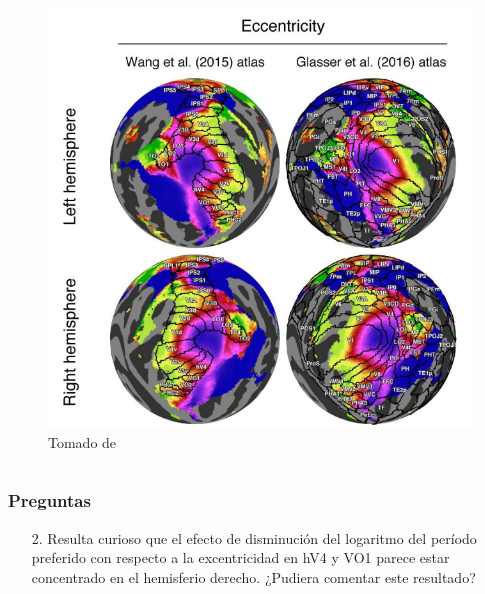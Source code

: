 \documentclass[
11pt, %
%
aspectratio=169, %
]{beamer}
\begin{document}
\begin{frame}
\begin{columns}[t]
\begin{column}{0.5\textwidth}
\begin{figure}
			\includegraphics[scale=0.35]{Graphics/glasser_wang_eccen}
			\captionsetup{font=tiny}
			\caption{Tomado de \cite{benson_human_2018}}
		\end{figure}
			
			
		\end{column}
		
	
		
		
	\end{columns}
	


\end{frame}

	\begin{frame}
	\frametitle{Preguntas}
	\begin{itemize}		
		
		\item[2.] Resulta curioso que el efecto de disminución del logaritmo del período preferido con respecto a la excentricidad en hV4 y VO1 parece estar concentrado en el hemisferio derecho. ¿Pudiera comentar este resultado?	 
		
	\end{itemize}     
	
	
	
	
\end{frame}
\end{document}
